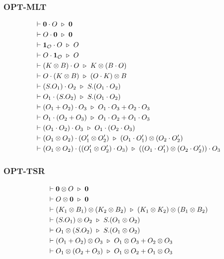 \subsubsection*{\textsf{OPT-MLT}}
\begin{align*}
  & \vdash \mathbf{0} \cdot O \ \triangleright\  \mathbf{0} \\
  & \vdash O \cdot \mathbf{0} \ \triangleright\  \mathbf{0} \\
  & \vdash \mathbf{1}_\mathcal{O} \cdot O \ \triangleright\  O \\
  & \vdash O \cdot \mathbf{1}_\mathcal{O} \ \triangleright\  O \\
  & \vdash (K \otimes B) \cdot O \ \triangleright\  K \otimes (B \cdot O)\\
  & \vdash O \cdot (K \otimes B) \ \triangleright\  (O \cdot K) \otimes B\\
  & \vdash (S.O_1) \cdot O_2 \ \triangleright\  S.(O_1 \cdot O_2) \\
  & \vdash O_1 \cdot (S.O_2) \ \triangleright\  S.(O_1 \cdot O_2) \\
  & \vdash (O_1 + O_2) \cdot O_3 \ \triangleright\  O_1 \cdot O_3 + O_2 \cdot O_3 \\
  & \vdash O_1 \cdot (O_2 + O_3) \ \triangleright\  O_1 \cdot O_2 + O_1 \cdot O_3 \\
  & \vdash (O_1 \cdot O_2) \cdot O_3 \ \triangleright\  O_1 \cdot (O_2 \cdot O_3) \\
  & \vdash (O_1 \otimes O_2) \cdot (O_1' \otimes O_2') \ \triangleright\  (O_1 \cdot O_1') \otimes (O_2 \cdot O_2') \\
  & \vdash (O_1 \otimes O_2) \cdot ((O_1' \otimes O_2') \cdot O_3) \ \triangleright\  ((O_1 \cdot O_1') \otimes (O_2 \cdot O_2')) \cdot O_3
\end{align*}


\subsubsection*{\textsf{OPT-TSR}}
\begin{align*}
  & \vdash \mathbf{0} \otimes O \ \triangleright\  \mathbf{0} \\
  & \vdash O \otimes \mathbf{0} \ \triangleright\  \mathbf{0} \\
  & \vdash (K_1 \otimes B_1) \otimes (K_2 \otimes B_2) \ \triangleright\  (K_1 \otimes K_2) \otimes (B_1 \otimes B_2) \\
  & \vdash (S.O_1) \otimes O_2 \ \triangleright\  S.(O_1 \otimes O_2) \\
  & \vdash O_1 \otimes (S.O_2) \ \triangleright\  S.(O_1 \otimes O_2) \\
  & \vdash (O_1 + O_2) \otimes O_3 \ \triangleright\  O_1 \otimes O_3 + O_2 \otimes O_3 \\
  & \vdash O_1 \otimes (O_2 + O_3) \ \triangleright\  O_1 \otimes O_2 + O_1 \otimes O_3
\end{align*}



